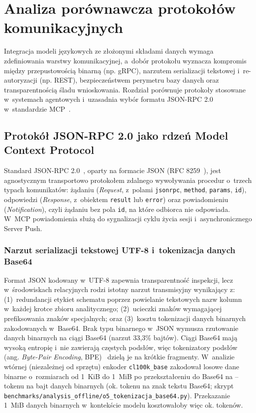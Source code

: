 \chapter{Analiza porównawcza protokołów komunikacyjnych}
\label{chap:protokoly}

Integracja modeli językowych ze złożonymi składami danych wymaga zdefiniowania warstwy komunikacyjnej, a~dobór protokołu wyznacza kompromis między przepustowością binarną (np. gRPC), narzutem serializacji tekstowej i~re-autoryzacji (np. REST), bezpieczeństwem perymetru bazy danych oraz transparentnością śladu wnioskowania. Rozdział porównuje protokoły stosowane w~systemach agentowych i~uzasadnia wybór formatu JSON-RPC 2.0 w~standardzie MCP~\cite{mcp_spec}.


\section{Protokół JSON-RPC 2.0 jako rdzeń Model Context Protocol}
\label{sec:protokoly_jsonrpc}

Standard JSON-RPC 2.0~\cite{jsonrpc2010}, oparty na formacie JSON (RFC 8259~\cite{rfc8259}), jest agnostycznym transportowo protokołem zdalnego wywoływania procedur o~trzech typach komunikatów: żądaniu (\emph{Request}, z~polami \texttt{jsonrpc}, \texttt{method}, \texttt{params}, \texttt{id}), odpowiedzi (\emph{Response}, z~obiektem \texttt{result} lub \texttt{error}) oraz powiadomieniu (\emph{Notification}), czyli żądaniu bez pola \texttt{id}, na które odbiorca nie odpowiada. W~MCP powiadomienia służą do sygnalizacji cyklu życia sesji i~asynchronicznego Server Push.

\subsection{Narzut serializacji tekstowej UTF-8 i~tokenizacja danych Base64}
\label{subsec:protokoly_narzut_bpe}

Format JSON kodowany w~UTF-8 zapewnia transparentność inspekcji, lecz w~środowiskach relacyjnych rodzi istotny narzut transmisyjny wynikający z: (1)~redundancji etykiet schematu poprzez powielanie tekstowych nazw kolumn w~każdej krotce zbioru analitycznego; (2)~ucieczki znaków wymagającej prefiksowania znaków specjalnych; oraz (3)~kosztu tokenizacji danych binarnych zakodowanych w~Base64. Brak typu binarnego w~JSON wymusza rzutowanie danych binarnych na ciągi Base64 (narzut 33,3\% bajtów). Ciągi Base64 mają wysoką entropię i~nie zawierają częstych podsłów, więc tokenizatory podsłów (ang. \emph{Byte-Pair Encoding}, BPE)~\cite{tiktoken} dzielą je na krótkie fragmenty. W~analizie wtórnej (niezależnej od sprzętu) enkoder \texttt{cl100k\_base} zakodował losowe dane binarne o~rozmiarach od 1~KiB do 1~MiB po przekształceniu do Base64 na \wynOfiveTokPerByteMin--\wynOfiveTokPerByteMax{} tokenu na bajt danych binarnych (ok. \wynOfiveTokPerChar{} tokenu na znak tekstu Base64; skrypt \texttt{benchmarks/analysis\_offline/o5\_tokenizacja\_base64.py}). Przekazanie 1~MiB danych binarnych w~kontekście modelu kosztowałoby więc ok. \wynOfiveTokOneMiB{} tokenów.


